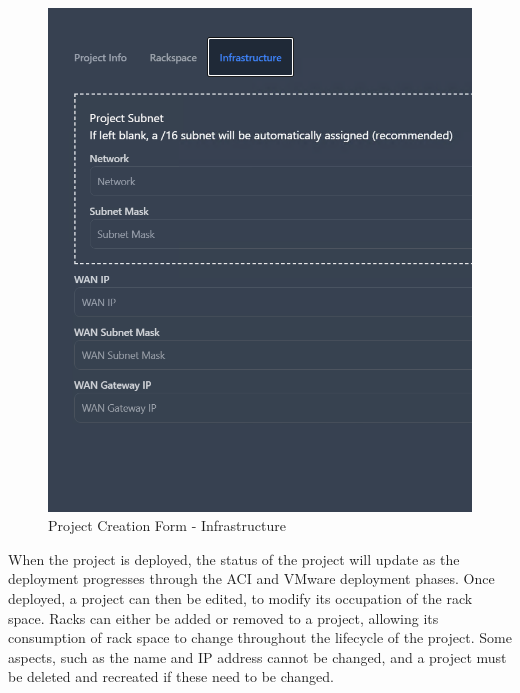 \begin{figure}[H]
    \centering
    \includegraphics[width=0.8\linewidth]{images/add-project-infrastructure.png}
    \caption{Project Creation Form - Infrastructure}
    \label{fig:userguide1}
\end{figure}

When the project is deployed, the status of the project will update as the deployment progresses through the ACI and VMware deployment phases. Once deployed, a project can then be edited, to modify its occupation of the rack space. Racks can either be added or removed to a project, allowing its consumption of rack space to change throughout the lifecycle of the project. Some aspects, such as the name and IP address cannot be changed, and a project must be deleted and recreated if these need to be changed.